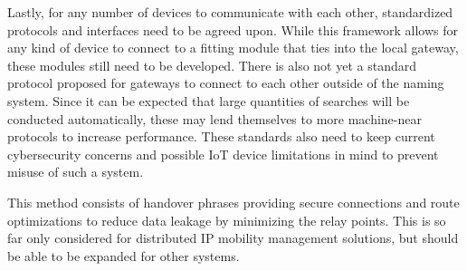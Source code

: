 \documentclass [journal]{IEEEtran}
\begin{document}
Lastly, for any number of devices to communicate with each other, standardized protocols and interfaces need to be agreed upon. While this framework allows for any kind of device to connect to a fitting module that ties into the local gateway, these modules still need to be developed. There is also not yet a standard protocol proposed for gateways to connect to each other outside of the naming system. Since it can be expected that large quantities of searches will be conducted automatically, these may lend themselves to more machine-near protocols to increase performance. These standards also need to keep current cybersecurity concerns and possible IoT device limitations in mind to prevent misuse of such a system. \par
This method consists of handover phrases providing secure connections and route optimizations to reduce data leakage by minimizing the relay points. This is so far only considered for distributed IP mobility management solutions, but should be able to be expanded for other systems.





% 
% 
%
 
 





 
\end{document}
